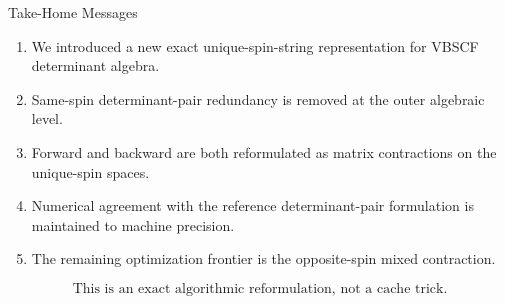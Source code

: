 \documentclass{beamer}
\providecommand{\backmatter}[1][]{}
\begin{document}
\begin{frame}{Take-Home Messages}
  \begin{enumerate}
    \item We introduced a new exact unique-spin-string representation for VBSCF
          determinant algebra.
    \item Same-spin determinant-pair redundancy is removed at the outer
          algebraic level.
    \item Forward and backward are both reformulated as matrix contractions on
          the unique-spin spaces.
    \item Numerical agreement with the reference determinant-pair formulation is
          maintained to machine precision.
    \item The remaining optimization frontier is the opposite-spin mixed
          contraction.
  \end{enumerate}

  \vspace{0.8em}
  \[
  \boxed{
  \text{This is an exact algorithmic reformulation, not a cache trick.}
  }
  \]
\end{frame}

\backmatter
\end{document}
